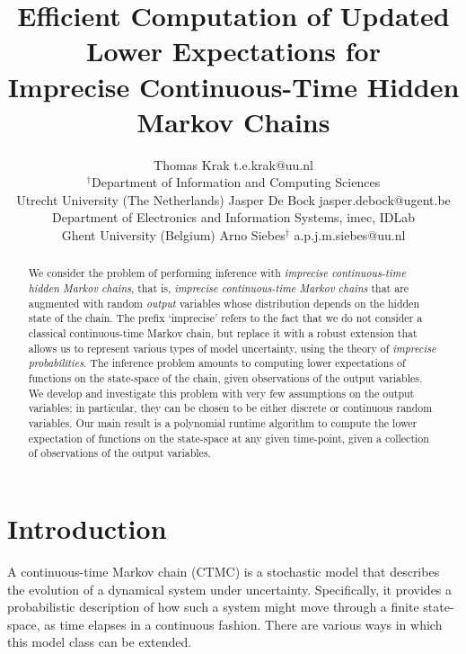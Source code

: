 \documentclass[twoside,11pt]{article}
\begin{document}
\title{Efficient Computation of Updated Lower Expectations for\\ Imprecise Continuous-Time Hidden Markov Chains}
\author{\name Thomas Krak \email t.e.krak@uu.nl\\
\addr $^\dagger$Department of Information and Computing Sciences\\
Utrecht University (The Netherlands)
\AND
\name Jasper De Bock \email jasper.debock@ugent.be\\
\addr Department of Electronics and Information Systems, imec, IDLab\\
Ghent University (Belgium)
\AND
\name Arno Siebes$^\dagger$ \email a.p.j.m.siebes@uu.nl
}
\maketitle
\vspace{-7pt}


\begin{abstract}We consider the problem of performing inference with \emph{imprecise continuous-time hidden Markov chains}, that is, \emph{imprecise continuous-time Markov chains} that are augmented with random \emph{output} variables whose distribution depends on the hidden state of the chain. The prefix `imprecise' refers to the fact that we do not consider a classical continuous-time Markov chain, but replace it with a robust extension that allows us to represent various types of model uncertainty, using the theory of \emph{imprecise probabilities}. The inference problem amounts to computing lower expectations of functions on the state-space of the chain, given observations of the output variables.
We develop and investigate this problem with very few assumptions on the output variables; in particular, they can be chosen to be either discrete or continuous random variables. Our main result is a polynomial runtime algorithm to compute the lower expectation of functions on the state-space at any given time-point, given a collection of observations of the output variables.\vspace{-3pt}
\end{abstract}

\section{Introduction}\label{sec:introduction}%

A continuous-time Markov chain (CTMC) is a stochastic model that describes the evolution of a dynamical system under uncertainty. Specifically, it provides a probabilistic description of how such a system might move through a finite state-space, as time elapses in a continuous fashion. There are various ways in which this model class can be extended.
\end{document}
